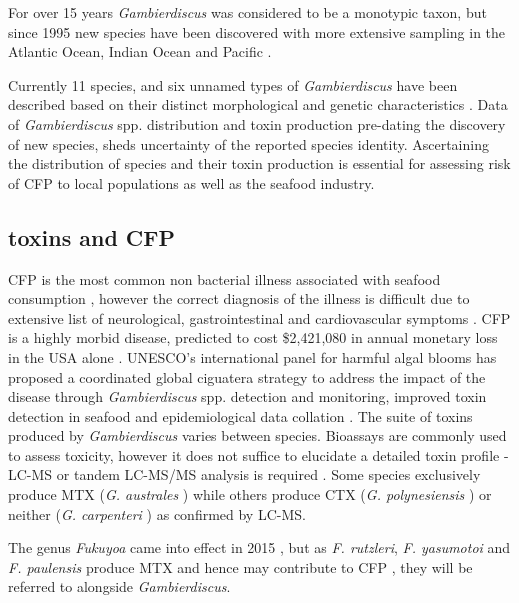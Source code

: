 \documentclass[12pt]{article}
\begin{document}
For over 15 years \emph{Gambierdiscus} was considered to be a monotypic taxon, but since 1995 new species have been discovered with more extensive sampling in the Atlantic Ocean, Indian Ocean and Pacific \cite{faust1995observation,holmes1998gambierdiscus,litaker2009taxonomy,chinain1999morphology,fraga2011gambierdiscus,nishimura2014morphology}.

Currently 11 species, and six unnamed types of \emph{Gambierdiscus} have been described based on their distinct morphological and genetic characteristics \cite{adachi1979thecal,faust1995observation,chinain1999morphology,litaker2009taxonomy,nishimura2014morphology,fraga2011gambierdiscus}. Data of \emph{Gambierdiscus} spp. distribution and toxin production pre-dating the discovery of new species, sheds uncertainty of the reported species identity. Ascertaining the distribution of species and their toxin production is essential for assessing risk of CFP to local populations as well as the seafood industry.

\subsection{toxins and CFP}
CFP is the most common non bacterial illness associated with seafood consumption \cite{friedman2008ciguatera}, however the correct diagnosis of the illness is difficult due to extensive list of neurological, gastrointestinal and cardiovascular symptoms \cite{sims1987theoretical}. CFP is a highly morbid disease, predicted to cost \$2,421,080 in annual monetary loss in the USA alone \cite{minor2014per}.  UNESCO's international panel for harmful algal blooms has proposed a coordinated global ciguatera strategy to address the impact of the disease through \emph{Gambierdiscus} spp. detection and monitoring, improved toxin detection in seafood and epidemiological data collation \cite{globalcig}.
The suite of toxins produced by \emph{Gambierdiscus} varies between species. Bioassays are commonly used to assess toxicity, however it does not suffice to elucidate a detailed toxin profile - LC-MS or tandem LC-MS/MS analysis is required \cite{diogened2014chemistry}. Some species exclusively produce MTX (\emph{G. australes} \cite{rhodes2014production}) while others produce CTX (\emph{G. polynesiensis} \cite{rhodes2014production}) or neither (\emph{G. carpenteri} \cite{kohli2014high}) as confirmed by LC-MS. 

The genus \emph{Fukuyoa} came into effect in 2015 \cite{gomez2015fukuyoa}, but as \emph{F. rutzleri}, \emph{F. yasumotoi} and \emph{F. paulensis} produce MTX and hence may contribute to CFP \cite{kohli2014feeding}, they will be referred to alongside \emph{Gambierdiscus}.
\end{document}
